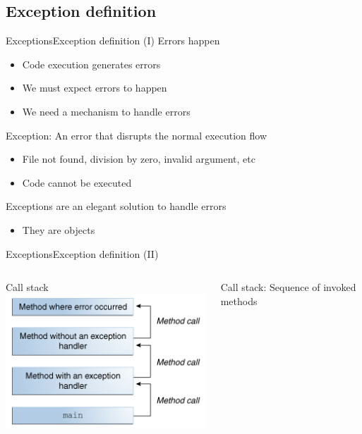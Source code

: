 \documentclass[10pt,compress]{beamer} %
\begin{document}
\subsection{Exception definition}
\begin{frame}{Exceptions}{Exception definition (I)}
	Errors happen
	\begin{itemize}
		\item Code execution generates errors
		\item We must expect errors to happen
		\item We need a mechanism to handle errors
	\end{itemize}

	\alert{Exception}: An error that disrupts the normal execution flow

	\begin{itemize}
		\item File not found, division by zero, invalid argument, etc
		\item Code cannot be executed
	\end{itemize}
	Exceptions are an elegant solution to handle errors
	\begin{itemize}
		\item They are objects
	\end{itemize}
\end{frame}

\begin{frame}{Exceptions}{Exception definition (II)}
    \begin{columns}
		\centering Call stack
		\centering \includegraphics[width=0.8\linewidth]{figs/exceptions-callstack.png}

		Call stack: Sequence of invoked methods
	\end{columns}
\end{frame}
\end{document}
